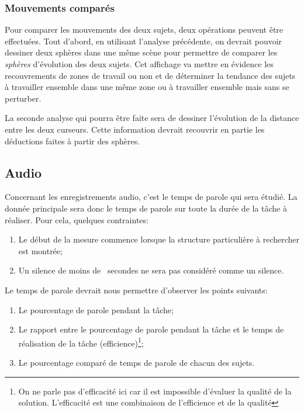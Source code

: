 \documentclass[a4paper,fleqn]{report}
\begin{document}
				\subsubsection{Mouvements comparés}
					Pour comparer les mouvements des deux sujets, deux opérations peuvent être effectuées.
					Tout d'abord, en utilisant l'analyse précédente, on devrait pouvoir dessiner deux sphères dans une même scène  pour permettre de comparer les \emph{sphères} d'évolution des deux sujets.
					Cet affichage va mettre en évidence les recouvrements de zones de travail ou non et de déterminer la tendance des sujets à travailler ensemble dans une même zone ou à travailler ensemble mais sans se perturber.

					La seconde analyse qui pourra être faite sera de dessiner l'évolution de la distance entre les deux curseurs.
					Cette information devrait recouvrir en partie les déductions faites à partir des sphères.

			\subsection{Audio}
				Concernant les enregistrements audio, c'est le temps de parole qui sera étudié.
				La donnée principale sera donc le temps de parole sur toute la durée de la tâche à réaliser.
				Pour cela, quelques contraintes:
				\begin{enumerate}
					\item Le début de la mesure commence lorsque la structure particulière à rechercher est montrée;
					\item Un silence de moins de ~secondes ne sera pas considéré comme un silence.
				\end{enumerate}
				Le temps de parole devrait nous permettre d'observer les points suivants:
				\begin{enumerate}
					\item Le pourcentage de parole pendant la tâche;
					\item Le rapport entre le pourcentage de parole pendant la tâche et le temps de réalisation de la tâche (efficience)\footnote{On ne parle pas d'efficacité ici car il est impossible d'évaluer la qualité de la solution. L'efficacité est une combinaison de l'efficience et de la qualité};
					\item Le pourcentage comparé de temps de parole de chacun des sujets.
				\end{enumerate}
\end{document}
